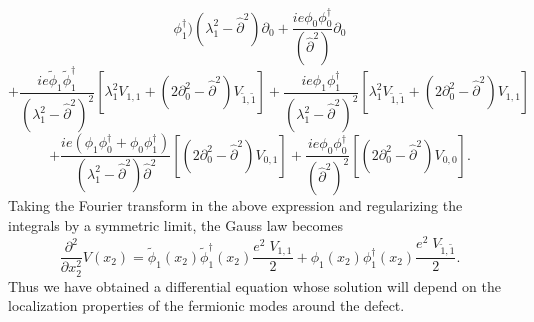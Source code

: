 \documentclass[a4paper,12pt]{article}
\begin{document}
{{$${  \phi^{\dagger}_1)}{(\lambda_1^2-\widehat \partial^2)} \partial_0 +
\frac{ie\phi_0\phi_0^{\dagger}}{(\widehat \partial^2)} \partial_0
$$
$$+ \frac{ie\widetilde{\phi}_1
  \widetilde{\phi}^{\dagger}_1}{(\lambda_1^2-\widehat \partial^2)^2}
[\lambda_1^2 V_{1,1}+(2\partial_0^2-{\widehat
  \partial}^2)V_{\tilde1,\tilde1}]+
\frac{ie\phi_1 \phi^{\dagger}_1}{(\lambda_1^2-\widehat\partial^2)^2}
[\lambda_1^2V_{\tilde1,\tilde1}+(2\partial_0^2-{\widehat
  \partial}^2)V_{1,1}]
$$
\begin{equation}
+ \frac{ie(\phi_1 \phi^{\dagger}_0 + \phi_0 \phi^{\dagger}_1)}
{(\lambda_1^2-{\widehat\partial}^2){\widehat\partial^2}}
[(2\partial_0^2-{\widehat\partial}^2)V_{0,1}] +
\frac{ie\phi_0\phi_0^{\dagger}}{({\widehat\partial}^2)^2}
[(2\partial_0^2-{\widehat
\partial}^2)V_{0,0}]. \label{trmasiva}
\end{equation}
Taking the Fourier transform in the above expression and regularizing
the integrals by a symmetric limit, the Gauss law becomes
\begin{equation}
\frac{\partial^2}{\partial x_2^2}V(x_2)
=\widetilde{\phi}_1(x_2)\widetilde{\phi}^{\dagger}_1(x_2)\frac{e^2\;V_{1,1}}{2}+
\phi_1(x_2)\phi^{\dagger}_1(x_2)\frac{e^2\;V_{\tilde1,\tilde1}}{2}.
\end{equation}
Thus we have obtained a differential equation whose solution will
depend on the localization properties of the fermionic modes around
the defect.

}}
\end{document}
